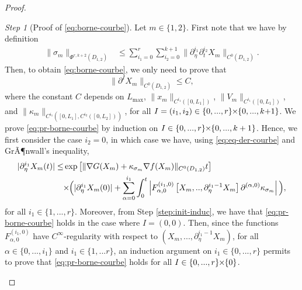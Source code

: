 \documentclass{article}
\newcommand{\Lmax}{L_{\max}}
\newcommand{\DI}{\partial^I}
\newcommand{\PLH}{{\mkern-1mu\times\mkern-1mu}}
\newcommand{\Times}{\PLH}
\newcommand{\ko}{\kappa}
\theoremstyle{remark}
\theoremstyle{prpart}
\newtheorem{proofpart}{Step}
\begin{document}
\begin{proof}
\begin{proofpart}[Proof of \eqref{eq:borne-courbe}]\label{step:borne}
Let $m\in\{1,2\}$. First note that we have by definition
\begin{align*}
\|\sigma_m\|_{\Phi^{r,k+2}(D_{1,2})} &\leq  \sum_{i_1=0}^{r}\sum_{i_2=0}^{k+1}\|\partial_{\eta}^{i_1}\partial_{t}^{i_2}X_m\|_{C^0(D_{1,2})}.
\end{align*}
Then, to obtain \eqref{eq:borne-courbe}, we only need to prove that
\begin{equation}\label{eq:pr-borne-courbe}
  \|\DI X_m\|_{C^0(D_{1,2})} \leq C,
\end{equation}
where the constant $C$ depends on $\Lmax$, $\|x_m\|_{C^{i_1}([0,L_1])}$, $\|V_m\|_{C^{i_1}([0,L_1])}$, and $\|\ko_m\|_{C^{i_1}([0,L_1],C^{i_2}([0,L_2]))}$,
for all $I=(i_1,i_2)\in\{0,...,r\}\Times\{0,...,k{+}1\}$. We prove \eqref{eq:pr-borne-courbe} by induction on $I\in\{0,...,r\}\Times\{0,...,k+1\}$. Hence, we first consider the case $i_2=0$, in which case we have, using \eqref{eq:eq-der-courbe} and GrÃ¶nwall's inequality,
\begin{equation*}
\begin{split}
|\partial_\eta^{i_1}X_m(t)|\leq&\exp\big[\|\nabla G(X_m) +\ko_{\sigma_m}\nabla f(X_m)\|_{C^0(D_{1,2})}t\big]\\
&\Times\Big(|\partial_\eta^{i_1} X_m(0)| + \sum_{\alpha=0}^{i_1}\int_0^t\left|F_{\alpha,0}^{(i_1,0)}\left[X_m,..,\partial_\eta^{i_1-1}X_m\right]\partial^{(\alpha,0)}\ko_{\sigma_m}\right|\Big),
\end{split}
\end{equation*}
for all $i_1\in\{1,...,r\}$. Moreover, from Step \ref{step:init-induc}, we have that \eqref{eq:pr-borne-courbe} holds in the case where $I=(0,0)$. Then, since the functions $F^{(i_1,0)}_{\alpha,0}$ have $C^\infty$-regularity with respect to $(X_m,...,\partial^{i_1-1}_\eta X_m)$, for all $\alpha\in\{0,...,i_1\}$ and $i_1\in\{1,...r\}$, an induction argument on $i_1\in\{0,...,r\}$ permits to prove that \eqref{eq:pr-borne-courbe} holds for all $I\in\{0,...,r\}\Times\{0\}$.
 

\end{proofpart}
\end{proof}
\end{document}
